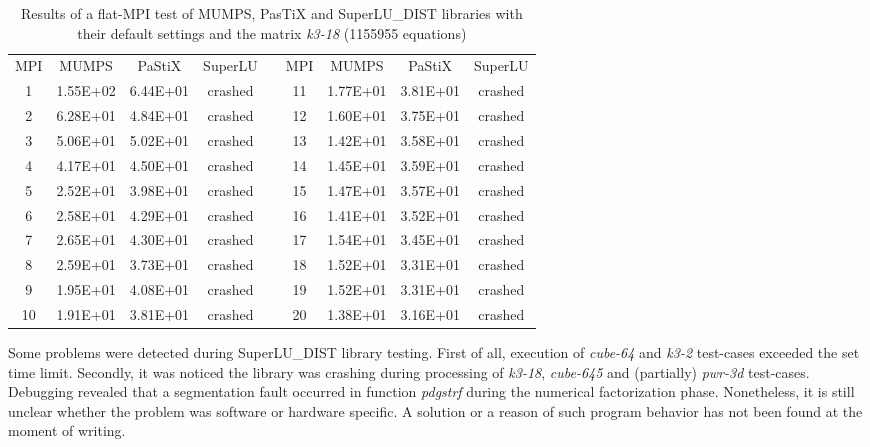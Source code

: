 \begin{table}[h!]
\centering
\begin{tabular}{|c|c|c|c|l|c|c|c|c|}
\cline{1-4} \cline{6-9}
MPI & MUMPS    & PaStiX   & SuperLU &  & MPI & MUMPS    & PaStiX   & SuperLU \\ \cline{1-4} \cline{6-9} 
1   & 1.55E+02 & 6.44E+01 & crashed &  & 11  & 1.77E+01 & 3.81E+01 & crashed \\ \cline{1-4} \cline{6-9} 
2   & 6.28E+01 & 4.84E+01 & crashed &  & 12  & 1.60E+01 & 3.75E+01 & crashed \\ \cline{1-4} \cline{6-9} 
3   & 5.06E+01 & 5.02E+01 & crashed &  & 13  & 1.42E+01 & 3.58E+01 & crashed \\ \cline{1-4} \cline{6-9} 
4   & 4.17E+01 & 4.50E+01 & crashed &  & 14  & 1.45E+01 & 3.59E+01 & crashed \\ \cline{1-4} \cline{6-9} 
5   & 2.52E+01 & 3.98E+01 & crashed &  & 15  & 1.47E+01 & 3.57E+01 & crashed \\ \cline{1-4} \cline{6-9} 
6   & 2.58E+01 & 4.29E+01 & crashed &  & 16  & 1.41E+01 & 3.52E+01 & crashed \\ \cline{1-4} \cline{6-9} 
7   & 2.65E+01 & 4.30E+01 & crashed &  & 17  & 1.54E+01 & 3.45E+01 & crashed \\ \cline{1-4} \cline{6-9} 
8   & 2.59E+01 & 3.73E+01 & crashed &  & 18  & 1.52E+01 & 3.31E+01 & crashed \\ \cline{1-4} \cline{6-9} 
9   & 1.95E+01 & 4.08E+01 & crashed &  & 19  & 1.52E+01 & 3.31E+01 & crashed \\ \cline{1-4} \cline{6-9} 
10  & 1.91E+01 & 3.81E+01 & crashed &  & 20  & 1.38E+01 & 3.16E+01 & crashed \\ \cline{1-4} \cline{6-9} 
\end{tabular}
\caption{Results of a flat-MPI test of MUMPS, PasTiX and SuperLU\_DIST libraries with their default settings and the matrix \textit{k3-18} (1155955 equations)}
\label{table:lc-k3-18-result}
\end{table}



Some problems were detected during  SuperLU\_DIST library testing. First of all, execution of \textit{cube-64} and \textit{k3-2} test-cases exceeded the set time limit. Secondly, it was noticed the library was crashing during processing of \textit{k3-18}, \textit{cube-645} and (partially) \textit{pwr-3d} test-cases. Debugging revealed that a segmentation fault occurred in function \textit{pdgstrf}  during the numerical factorization phase. Nonetheless, it is still unclear whether the problem was software or hardware specific. A solution or a reason of such program behavior has not been found at the moment of writing.\\


